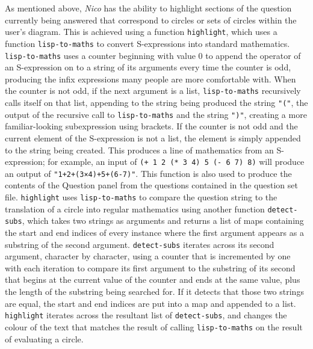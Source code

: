 \documentclass[12pt,twoside,notitlepage,xetex]{report}
\begin{document}
As mentioned above, \emph{Nico} has the ability to highlight sections of the
question currently being answered that correspond to circles or sets of circles
within the user's diagram.  This is achieved using a function \verb¬highlight¬,
which uses a function \verb¬lisp-to-maths¬ to convert S-expressions into
standard mathematics.  \verb¬lisp-to-maths¬ uses a counter beginning with value
0 to append the operator of an S-expression on to a string of its arguments
every time the counter is odd, producing the infix expressions many people are
more comfortable with.  When the counter is not odd, if the next argument is a
list, \verb¬lisp-to-maths¬ recursively calls itself on that list, appending to
the string being produced the string \verb¬"("¬, the output of the recursive
call to \verb¬lisp-to-maths¬ and the string \verb¬")"¬, creating a more
familiar-looking subexpression using brackets.  If the counter is not odd and
the current element of the S-expression is not a list, the element is simply
appended to the string being created.  This produces a line of mathematics from
an S-expression; for example, an input of \verb¬(+ 1 2 (* 3 4) 5 (- 6 7) 8)¬
will produce an output of \verb¬"1+2+(3×4)+5+(6-7)"¬.  This function is also
used to produce the contents of the {\sfapp Question} panel from the questions
contained in the question set file.  \verb¬highlight¬ uses \verb¬lisp-to-maths¬
to compare the question string to the translation of a circle into regular
mathematics using another function \verb¬detect-subs¬, which takes two strings
as arguments and returns a list of maps containing the start and end indices of
every instance where the first argument appears as a substring of the second
argument.  \verb¬detect-subs¬ iterates across its second argument, character by
character, using a counter that is incremented by one with each iteration to
compare its first argument to the substring of its second that begins at the
current value of the counter and ends at the same value, plus the length of the
substring being searched for.  If it detects that those two strings are equal,
the start and end indices are put into a map and appended to a list.
\verb¬highlight¬ iterates across the resultant list of \verb¬detect-subs¬, and
changes the colour of the text that matches the result of calling
\verb¬lisp-to-maths¬ on the result of evaluating a circle.
\end{document}
